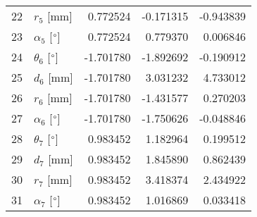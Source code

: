 \documentclass{standalone}%
\begin{document}
\begin{tabular}{llrrr}
22 &              $r_{5}$ [mm] &  0.772524 &  -0.171315 &  -0.943839 \\
23 &  $\alpha_{5}$ [$\degree$] &  0.772524 &   0.779370 &   0.006846 \\
24 &  $\theta_{6}$ [$\degree$] & -1.701780 &  -1.892692 &  -0.190912 \\
25 &              $d_{6}$ [mm] & -1.701780 &   3.031232 &   4.733012 \\
26 &              $r_{6}$ [mm] & -1.701780 &  -1.431577 &   0.270203 \\
27 &  $\alpha_{6}$ [$\degree$] & -1.701780 &  -1.750626 &  -0.048846 \\
28 &  $\theta_{7}$ [$\degree$] &  0.983452 &   1.182964 &   0.199512 \\
29 &              $d_{7}$ [mm] &  0.983452 &   1.845890 &   0.862439 \\
30 &              $r_{7}$ [mm] &  0.983452 &   3.418374 &   2.434922 \\
31 &  $\alpha_{7}$ [$\degree$] &  0.983452 &   1.016869 &   0.033418 \\
\bottomrule
\end{tabular}
%
\end{document}
